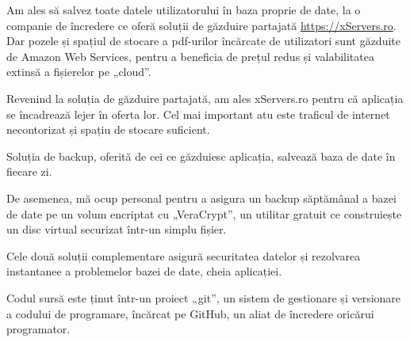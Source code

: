 	Am ales să salvez toate datele utilizatorului în baza proprie de date, la o companie de încredere ce oferă soluții de găzduire partajată \url{https://xServers.ro}\cite{xservers}.
	Dar pozele și spațiul de stocare a pdf-urilor încărcate de utilizatori sunt găzduite de Amazon Web Services\cite{aws}, pentru a beneficia de prețul redus și valabilitatea extinsă a fișierelor pe „cloud”.

	Revenind la soluția de găzduire partajată, am ales xServers.ro\cite{xservers} pentru că aplicația se încadrează lejer în oferta lor.
	Cel mai important atu este traficul de internet necontorizat și spațiu de stocare suficient.

	Soluția de backup, oferită de cei ce găzduiesc aplicația, salvează baza de date în fiecare zi.

	De asemenea, mă ocup personal pentru a asigura un backup săptămânal a bazei de date pe un volum encriptat cu „VeraCrypt”\cite{veracrypt}, un utilitar gratuit ce construiește un disc virtual securizat într-un simplu fișier.

	Cele două soluții complementare asigură securitatea datelor și rezolvarea instantanee a problemelor bazei de date, cheia aplicației.

	Codul sursă este ținut într-un proiect „git”, un sistem de gestionare și versionare a codului de programare, încărcat pe GitHub, un aliat de încredere oricărui programator.
